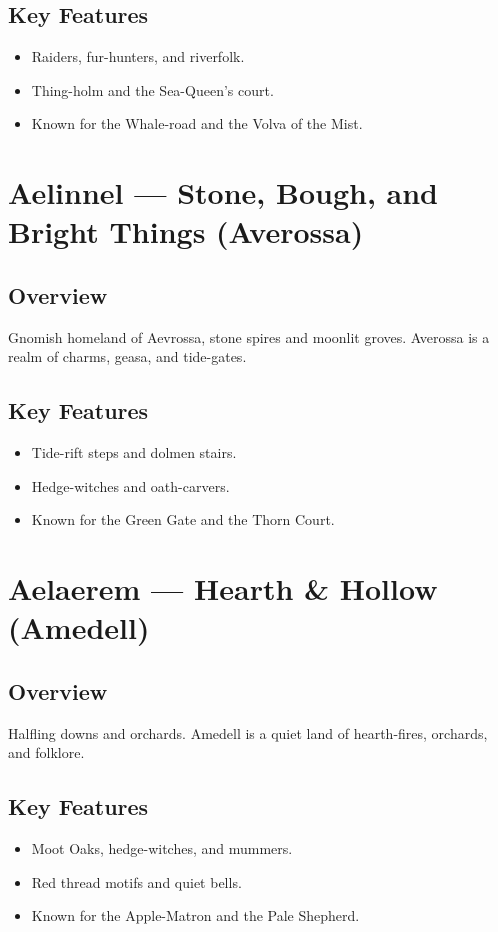 \subsection*{Key Features}
\begin{itemize}[leftmargin=*]
    \item Raiders, fur-hunters, and riverfolk.
    \item Thing-holm and the Sea-Queen’s court.
    \item Known for the Whale-road and the Volva of the Mist.
\end{itemize}

\section{Aelinnel — Stone, Bough, and Bright Things (Averossa)}
\label{sec:lore-aelinnel}

\subsection*{Overview}
Gnomish homeland of Aevrossa, stone spires and moonlit groves. Averossa is a realm of charms, geasa, and tide-gates.

\subsection*{Key Features}
\begin{itemize}[leftmargin=*]
    \item Tide-rift steps and dolmen stairs.
    \item Hedge-witches and oath-carvers.
    \item Known for the Green Gate and the Thorn Court.
\end{itemize}

\section{Aelaerem — Hearth \& Hollow (Amedell)}
\label{sec:lore-aelaerem}

\subsection*{Overview}
Halfling downs and orchards. Amedell is a quiet land of hearth-fires, orchards, and folklore.

\subsection*{Key Features}
\begin{itemize}[leftmargin=*]
    \item Moot Oaks, hedge-witches, and mummers.
    \item Red thread motifs and quiet bells.
    \item Known for the Apple-Matron and the Pale Shepherd.
\end{itemize}

